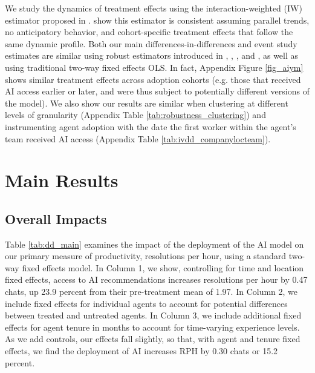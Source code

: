 \documentclass[11pt]{article}
\begin{document}
We study the dynamics of treatment effects using the interaction-weighted (IW) estimator proposed in \citet{sun_estimating_2020}.  \citet{sun_estimating_2020} show this estimator is consistent assuming parallel trends, no anticipatory behavior, and cohort-specific treatment effects that follow the same dynamic profile.
Both our main differences-in-differences and event study estimates are similar using robust estimators introduced in \citet{dechaisemartin2020}, 
\citet{sun_estimating_2020},
\citet{callaway_2021},
and
\citet{borusyak2022revisiting}, as well as using traditional two-way fixed effects OLS. In fact, Appendix Figure \ref{fig_aiym} shows similar treatment effects across adoption cohorts (e.g. those that received AI access earlier or later, and were thus subject to potentially different versions of the model).  We also show our results are similar when clustering at different levels of granularity (Appendix Table \ref{tab:robustness_clustering}) and instrumenting agent adoption with the date the first worker within the agent's team received AI access (Appendix Table \ref{tab:ivdd_companylocteam}). 

\section{Main Results}

\subsection{Overall Impacts}
Table \ref{tab:dd_main} examines the impact of the deployment of the AI model on our primary measure of productivity, resolutions per hour, using a standard two-way fixed effects model.  In Column 1, we show, controlling for time and location fixed effects, access to AI recommendations increases resolutions per hour by 0.47 chats, up 23.9 percent from their pre-treatment mean of 1.97.  In Column 2, we include fixed effects for individual agents to account for potential differences between treated and untreated agents.  In Column 3, we include additional fixed effects for agent tenure in months to account for time-varying experience levels.  As we add controls, our effects fall slightly, so that, with agent and tenure fixed effects, we find the deployment of AI increases RPH by 0.30 chats or 15.2 percent. 
\end{document}
